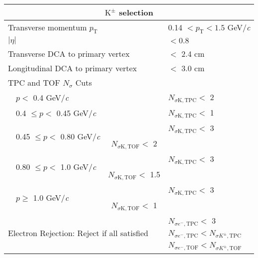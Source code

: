 \documentclass[ALICE,manyauthors]{cernphprep}
\newcommand{\Kpm}{$\mathrm{K^{\pm}}$\xspace}
\begin{document}
\begin{table}[htbp]
 \centering
  \renewcommand{\arraystretch}{1.05}
  \begin{tabular}{lcc|c|l}
   \hline  
   \multicolumn{5}{c}{\textbf{\Kpm selection}} \\
   \hline
   \multicolumn{4}{l|}{Transverse momentum $p_{\mathrm{T}}$} & 0.14 $< p_{\mathrm{T}} < 1.5$ GeV/\textit{c} \\
   \hline
   \multicolumn{4}{l|}{$|\eta|$} & $< 0.8$ \\
   \hline
   \multicolumn{4}{l|}{Transverse DCA to primary vertex} & $<$ 2.4 cm \\
   \hline
   \multicolumn{4}{l|}{Longitudinal DCA to primary vertex} & $<$ 3.0 cm \\
   \hline

   \multicolumn{5}{l}{TPC and TOF $N_{\sigma}$ Cuts} \\
   \cline{2-5}
    & \multicolumn{2}{l}{$p <$ 0.4 GeV/\textit{c}} &  & $N_{\sigma \mathrm{K,TPC}} <$ 2 \\
   \cline{2-5}
    & \multicolumn{2}{l}{0.4 $\leq p <$ 0.45 GeV/\textit{c}} & & $N_{\sigma \mathrm{K,TPC}} <$ 1 \\
   \cline{2-5}     
    & \multicolumn{2}{l}{\multirow{2}{*}{0.45 $\leq p <$ 0.80 GeV/\textit{c}}} & & $N_{\sigma \mathrm{K,TPC}} <$ 3 \\ 
   \multicolumn{4}{c|}{} & $N_{\sigma \mathrm{K,TOF}} <$ 2 \\
   \cline{2-5}
    & \multicolumn{2}{l}{\multirow{2}{*}{0.80 $\leq p <$ 1.0 GeV/\textit{c}}} & & $N_{\sigma \mathrm{K,TPC}} <$ 3 \\
   \multicolumn{4}{c|}{} & $N_{\sigma \mathrm{K,TOF}} <$ 1.5 \\  
   \cline{2-5}
    & \multicolumn{2}{l}{\multirow{2}{*}{$p \geq$ 1.0 GeV/\textit{c}}} & & $N_{\sigma \mathrm{K,TPC}} <$ 3 \\
   \multicolumn{4}{c|}{} & $N_{\sigma \mathrm{K,TOF}} <$ 1 \\  
   \hline
   
   \multicolumn{4}{l|}{\multirow{3}{*}{Electron Rejection: Reject if all satisfied}} & $N_{\sigma e^{-},\mathrm{TPC}} < $ 3 \\
   \multicolumn{4}{c|}{} & $N_{\sigma e^{-},\mathrm{TPC}} < N_{\sigma K^{\pm},\mathrm{TPC}}$ \\
   \multicolumn{4}{c|}{} & $N_{\sigma e^{-},\mathrm{TOF}} < N_{\sigma K^{\pm},\mathrm{TOF}}$ \\
   \hline
   

\end{tabular}
\end{table}
\end{document}
